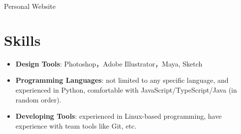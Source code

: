 \documentclass{resume}
\newcommand{\en}[1]{#1}
\newcommand{\zh}[1]{}
\begin{document}
\en{Personal Website}
\zh{个人网站}

\section{\en{Skills}\zh{技能}}
\begin{itemize}[parsep=0.25ex]
      \item \en{\textbf{Design Tools}:
                  Photoshop，Adobe Illustrator，Maya, Sketch}
            \zh{\textbf{设计软件}:
                  Photoshop，Adobe Illustrator，Maya,Sketch}
                  
      \item \en{\textbf{Programming Languages}:
                  not limited to any specific language,
                  and experienced in Python,
                  comfortable with JavaScript/TypeScript/Java (in random order).}
            \zh{\textbf{编程语言}:
                  不局限于特定编程语言，且尤其熟悉 JavaScript 等，
                  了解 Java/Python/Kotlin/TypeScript 等（不分先后）。}

      \item \en{\textbf{Developing Tools}:
                  experienced in Linux-based programming,
                  have experience with team tools like Git, etc.}
            \zh{\textbf{开发工具}:
                  十分熟悉 Linux，有 Git 等团队合作工具的经验。}
\end{itemize}
\end{document}

